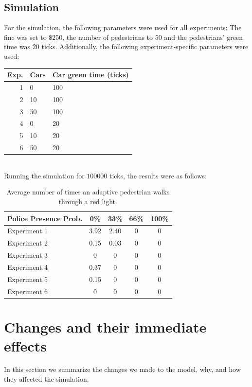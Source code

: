 \documentclass[a4paper]{article}
\begin{document}
\subsection{Simulation}
\label{sec:initialsim}
For the simulation, the following parameters were used for all experiments: The fine was set to $\$250$, the number of pedestrians to $50$ and the pedestrians' green time was $20$ ticks. Additionally, the following experiment-specific parameters were used:\\

\begin{tabular}{ r | l | l }
  Exp. & Cars & Car green time (ticks) \\
  \hline
  1 &  0 & 100 \\
  2 & 10 & 100 \\
  3 & 50 & 100 \\
  4 &  0 & 20  \\
  5 & 10 & 20  \\
  6 & 50 & 20  \\
\end{tabular}\\

Running the simulation for $100 000$ ticks, the results were as follows:
\begin{table}[H]
\centering
\begin{tabular}{ l | c c c c }
  Police Presence Prob. & 0\% & 33\% & 66\% & 100\% \\ 
  \hline
  Experiment 1 & 3.92 & 2.40 & 0 & 0  \\
  Experiment 2 & 0.15 & 0.03 & 0 & 0  \\
  Experiment 3 & 0    & 0    & 0 & 0  \\
  Experiment 4 & 0.37 & 0    & 0 & 0  \\
  Experiment 5 & 0.15 & 0    & 0 & 0  \\
  Experiment 6 & 0    & 0    & 0 & 0  \\
\end{tabular}
\caption{Average number of times an adaptive 
pedestrian walks through a red light.}
\end{table}

\clearpage

\section{Changes and their immediate effects}
In this section we summarize the changes we made to the model, why, and how they affected the simulation.
\end{document}
